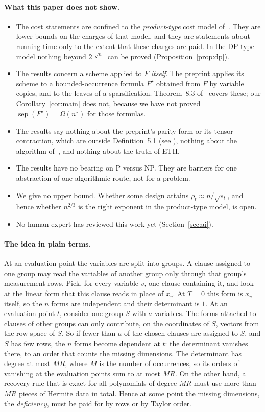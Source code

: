 \documentclass[11pt,a4paper]{article}
\theoremstyle{definition}
\theoremstyle{remark}
\newcommand{\sep}{\operatorname{sep}}
\begin{document}
\paragraph{What this paper does not show.}
\begin{itemize}
\item The cost statements are confined to the \emph{product-type} cost model
 of~\cite[Section~5.2]{DL}. They are lower bounds on the charges of that model, and they are
 statements about running time only to the extent that these charges are paid. In the
 DP-type model nothing beyond $2^{\lceil\sqrt n\rceil}$ can be proved
 (Proposition~\ref{prop:dp}).
\item The results concern a scheme applied to $F$ \emph{itself}. The preprint applies its
 scheme to a bounded-occurrence formula $F^\star$ obtained from $F$ by variable copies, and
 to the leaves of a sparsification. Theorem~8.3 of~\cite{DL} covers these; our
 Corollary~\ref{cor:main} does not, because we have not proved $\sep(F^\star)=\Omega(n^\star)$
 for those formulas.
\item The results say nothing about the preprint's parity form or its tensor contraction,
 which are outside Definition~5.1 (see \cite[Section~5.1]{DL}), nothing about the algorithm
 of~\cite{Claude}, and nothing about the truth of ETH.
\item The results have no bearing on P versus NP. They are barriers for one abstraction of
 one algorithmic route, not for a problem.
\item We give no upper bound. Whether some design attains $\rho_t\approx n/\sqrt{s_t}$, and
 hence whether $n^{2/3}$ is the right exponent in the product-type model, is open.
\item No human expert has reviewed this work yet (Section~\ref{sec:ai}).
\end{itemize}

\paragraph{The idea in plain terms.}
At an evaluation point the variables are split into groups. A clause assigned to one group
may read the variables of another group only through that group's measurement rows. Pick, for
every variable $v$, one clause containing it, and look at the linear form that this clause
reads in place of $x_v$. At $T=0$ this form is $x_v$ itself, so the $n$ forms are
independent and their determinant is $1$. At an evaluation point $t$, consider one group $S$
with $a$ variables. The forms attached to clauses of other groups can only contribute, on the
coordinates of $S$, vectors from the row space of $S$. So if fewer than $a$ of the chosen
clauses are assigned to $S$, and $S$ has few rows, the $n$ forms become dependent at $t$: the
determinant vanishes there, to an order that counts the missing dimensions. The determinant
has degree at most $MR$, where $M$ is the number of occurrences, so its orders of vanishing
at the evaluation points sum to at most $MR$. On the other hand, a recovery rule that is
exact for all polynomials of degree $MR$ must use more than $MR$ pieces of Hermite data in
total. Hence at some point the missing dimensions, the \emph{deficiency}, must be paid for
by rows or by Taylor order.
\end{document}
